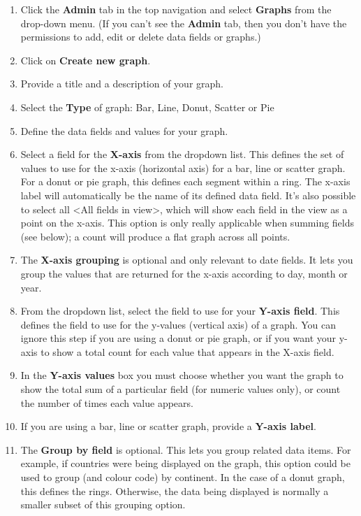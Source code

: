 \documentclass{ctrlo-int-toc}
\begin{document}
\begin{admin}
\begin{enumerate}
\item Click the \textbf{Admin} tab in the top navigation and select \textbf{Graphs} from the drop-down menu. (If you can't see the \textbf{Admin} tab, then you don't have the permissions to add, edit or delete data fields or graphs.)
\item Click on \textbf{Create new graph}.
\item Provide a title and a description of your graph. 
\item Select the \textbf{Type} of graph: Bar, Line, Donut, Scatter or Pie
\item Define the data fields and values for your graph. 
\item Select a field for the \textbf{X-axis} from the dropdown list. This defines the set of values to use for the x-axis (horizontal axis) for a bar, line or scatter graph. For a donut or pie graph, this defines each segment within a ring. The x-axis label will automatically be the name of its defined data field. It's also possible to select all <All fields in view>, which will show each field in the view as a point on the x-axis. This option is only really applicable when summing fields (see below); a count will produce a flat graph across all points.
\item The \textbf{X-axis grouping} is optional and only relevant to date fields. It lets you group the values that are returned for the x-axis according to day, month or year. 
\item From the dropdown list, select the field to use for your \textbf{Y-axis field}. This defines the field to use for the y-values (vertical axis) of a graph. You can ignore this step if you are using a donut or pie graph, or if you want your y-axis to show a total count for each value that appears in the X-axis field. \ 
\item In the \textbf{Y-axis values} box you must choose whether you want the graph to show the total sum of a particular field (for numeric values only), or count the number of times each value appears. 
\item If you are using a bar, line or scatter graph, provide a \textbf{Y-axis label}.
\item The \textbf{Group by field} is optional. This lets you group related data items. For example, if countries were being displayed on the graph, this option could be used to group (and colour code) by continent. In the case of a donut graph, this defines the rings. Otherwise, the data being displayed is normally a smaller subset of this grouping option.

\end{enumerate}
\end{admin}
\end{document}
